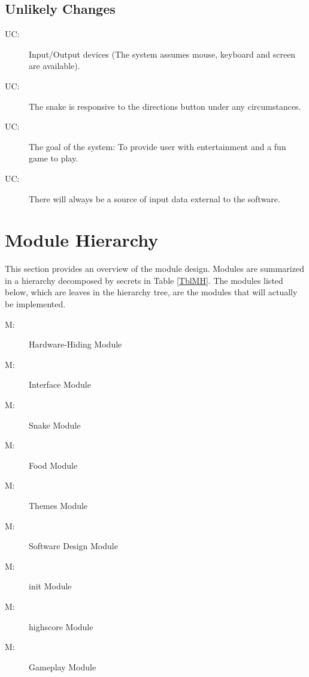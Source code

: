 \documentclass[12pt, titlepage]{article}
\newcounter{ucnum}
\newcommand{\uctheucnum}{UC\theucnum}
\newcounter{mnum}
\newcommand{\mthemnum}{M\themnum}
\begin{document}
\subsection{Unlikely Changes} \label{SecUchange}


\begin{description}
\item[ \uctheucnum \label{ucIO}:] Input/Output devices
  (The system assumes mouse, keyboard and screen are available).
\item[ \uctheucnum \label{ucInput}:] The snake is responsive to the directions button under any circumstances.
\item[ \uctheucnum \label{ucInput}:] The goal of the system: To provide user with entertainment and a fun game to play. 
\item[ \uctheucnum \label{ucInput}:] There will always be a source of input data external to the software.
\end{description}

\section{Module Hierarchy} \label{SecMH}

This section provides an overview of the module design. Modules are summarized
in a hierarchy decomposed by secrets in Table \ref{TblMH}. The modules listed
below, which are leaves in the hierarchy tree, are the modules that will
actually be implemented.

\begin{description}
\item [ \mthemnum \label{mHH}:] Hardware-Hiding Module
\item [ \mthemnum \label{mHH}:] Interface Module
\item [ \mthemnum \label{mHH}:] Snake Module
\item [ \mthemnum \label{mHH}:] Food Module
\item [ \mthemnum \label{mHH}:] Themes Module
\item [ \mthemnum \label{mHH}:] Software Design Module
\item [ \mthemnum \label{mHH}:] init Module
\item [ \mthemnum \label{mHH}:] highscore Module
\item [ \mthemnum \label{mHH}:] Gameplay Module
\end{description}
\end{document}
